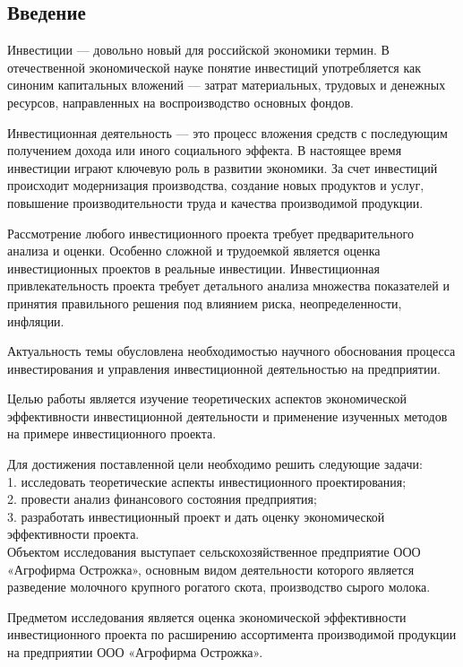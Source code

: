 \subsection*{Введение}
Инвестиции --- довольно новый для российской экономики термин. В отечественной экономической науке понятие инвестиций употребляется как синоним капитальных вложений --- затрат материальных, трудовых и денежных ресурсов, направленных на воспроизводство основных фондов.

Инвестиционная деятельность --- это процесс вложения средств с последующим получением дохода или иного социального эффекта. В настоящее время инвестиции играют ключевую роль в развитии экономики. За счет инвестиций происходит модернизация производства, создание новых продуктов и услуг, повышение производительности труда и качества производимой продукции.

Рассмотрение любого инвестиционного проекта требует предварительного анализа и оценки. Особенно сложной и трудоемкой является оценка инвестиционных проектов в реальные инвестиции. Инвестиционная привлекательность проекта требует детального анализа множества показателей и принятия правильного решения под влиянием риска, неопределенности, инфляции.

Актуальность темы обусловлена необходимостью научного обоснования процесса инвестирования и управления инвестиционной деятельностью на предприятии.

Целью работы является изучение теоретических аспектов экономической эффективности инвестиционной деятельности и применение изученных методов на примере инвестиционного проекта.

Для достижения поставленной цели необходимо решить следующие задачи:\\
1. исследовать теоретические аспекты инвестиционного проектирования;\\
2. провести анализ финансового состояния предприятия;\\
3. разработать инвестиционный проект и дать оценку экономической эффективности проекта.\\

Объектом исследования выступает сельскохозяйственное предприятие ООО «Агрофирма Острожка», основным видом деятельности которого является разведение молочного крупного рогатого скота, производство сырого молока.

Предметом исследования является оценка экономической эффективности инвестиционного проекта по расширению ассортимента производимой продукции на предприятии ООО «Агрофирма Острожка».

